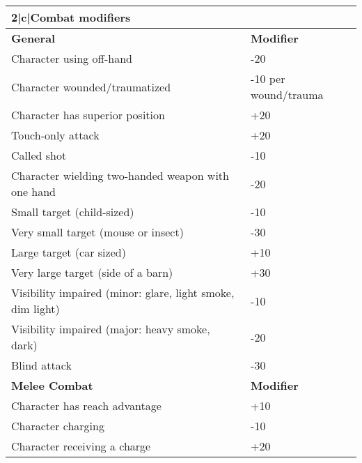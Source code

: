 \begin{table} \begin{tabularx}{\hline}{|X|l|} \hline

\hline{2}{|c|}{\textbf{Combat modifiers}}	\\ \hline

\textbf{General} &\textbf{Modifier}	\\ \hline

Character using off-hand	&-20	\\ \hline

Character wounded/traumatized	&-10 per wound/trauma	\\ \hline

Character has superior position	&+20	\\ \hline

Touch-only attack	&+20	\\ \hline

Called shot	&-10	\\ \hline

Character wielding two-handed weapon with one hand &-20	\\ \hline

Small target (child-sized)	&-10	\\ \hline

Very small target (mouse or insect)	&-30	\\ \hline

Large target (car sized) &+10	\\ \hline

Very large target (side of a barn) &+30	\\ \hline

Visibility impaired (minor: glare, light smoke, dim light) &-10	\\ \hline

Visibility impaired (major: heavy smoke, dark) &-20	\\ \hline

Blind attack &-30	\\ \hline

\textbf{Melee Combat} &\textbf{Modifier}	\\ \hline

Character has reach advantage &+10	\\ \hline

Character charging &-10	\\ \hline

Character receiving a charge &+20	\\ \hline


\end{tabularx}
\end{table}
